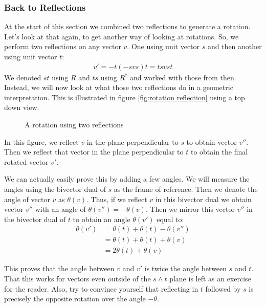 \documentclass[10pt]{report}
\begin{document}
\subsubsection{Back to Reflections}

At the start of this section we combined two reflections to
generate a rotation. Let's look at that again, to get another way
of looking at rotations. So, we perform two reflections on any
vector $v$. One using unit vector $s$ and then another using unit
vector $t$:
\begin{align*}
    v' = -t(-svs)t = tsvst
\end{align*}
We denoted $st$ using $R$ and $ts$ using $R^\dagger$ and worked
with those from then. Instead, we will now look at what those two
reflections do in a geometric interpretation. This is illustrated
in figure \ref{fig:rotation reflection} using a top down view.

\begin{figure}[ht]
\centering

\caption{A rotation using two reflections} \label{fig:rotation
reflection}
\end{figure}

In this figure, we reflect $v$ in the plane perpendicular to $s$
to obtain vector $v''$. Then we reflect that vector in the plane
perpendicular to $t$ to obtain the final rotated vector $v'$.

We can actually easily prove this by adding a few angles. We will
measure the angles using the bivector dual of $s$ as the frame of
reference. Then we denote the angle of vector $v$ as $\theta(v)$.
Thus, if we reflect $v$ in this bivector dual we obtain vector
$v''$ with an angle of $\theta(v'') = -\theta(v)$. Then we mirror
this vector $v''$ in the bivector dual of $t$ to obtain an angle
$\theta(v')$ equal to:
\begin{align*}
    \theta(v') &= \theta(t) + \theta(t) - \theta(v'') \\
               &= \theta(t) + \theta(t) + \theta(v) \\
               &= 2\theta(t) + \theta(v)
\end{align*}

This proves that the angle between $v$ and $v'$ is twice the angle
between $s$ and $t$. That this works for vectors even outside of
the $s\wedge t$ plane is left as an exercise for the reader. Also,
try to convince yourself that reflecting in $t$ followed by $s$ is
precisely the opposite rotation over the angle $-\theta$.
\end{document}
